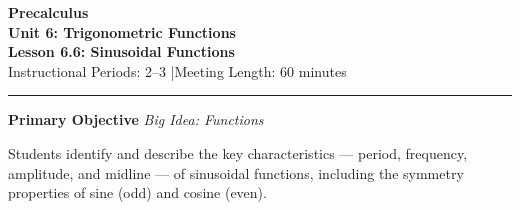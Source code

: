 \documentclass[10pt]{article}
\begin{document}
\begin{center}
  {\Large\bfseries\color{navy} Precalculus}\\[4pt]
  {\large\bfseries Unit 6: Trigonometric Functions}\\[2pt]
  {\large\bfseries Lesson 6.6: Sinusoidal Functions}\\[2pt]
  {\normalsize Instructional Periods: 2--3 \quad|\quad Meeting Length: 60 minutes}
\end{center}

\vspace{4pt}
\hrule
\vspace{8pt}

\begin{tcolorbox}[colback=sky, colframe=navy, boxrule=0.9pt, arc=2mm,
    left=2mm, right=2mm, top=1.5mm, bottom=1.5mm]
  \textbf{Primary Objective} \hfill \textit{Big Idea: Functions}

  \medskip
  Students identify and describe the key characteristics --- period, frequency,
  amplitude, and midline --- of sinusoidal functions, including the symmetry
  properties of sine (odd) and cosine (even).
\end{tcolorbox}

\vspace{6pt}
\end{document}
